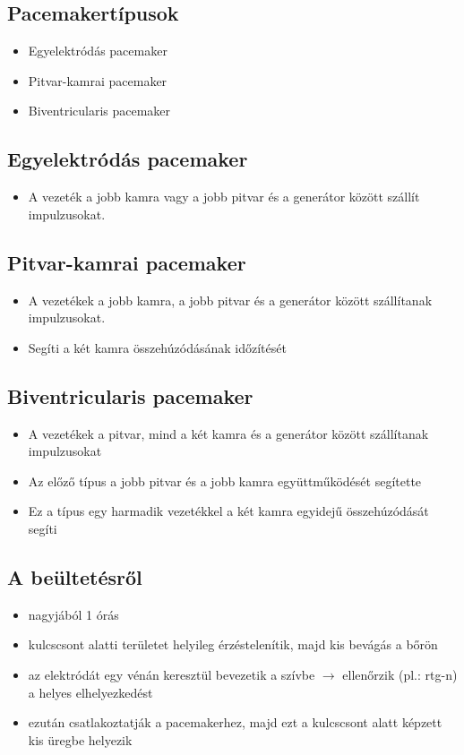 \subsection{Pacemakertípusok}
\begin{itemize}
    \item Egyelektródás pacemaker
    \item Pitvar-kamrai pacemaker
    \item Biventricularis pacemaker
\end{itemize}

\subsection{Egyelektródás pacemaker}
\begin{itemize}
    \item A vezeték a jobb
    kamra vagy a jobb
    pitvar és a generátor
    között szállít
    impulzusokat.
\end{itemize}

\subsection{Pitvar-kamrai pacemaker}
\begin{itemize}
    \item A vezetékek a jobb kamra, a jobb pitvar és a
    generátor között szállítanak impulzusokat.
    \item Segíti a két kamra
    összehúzódásának
    időzítését
\end{itemize}

\subsection{Biventricularis pacemaker}
\begin{itemize}
    \item A vezetékek a pitvar, mind a két
    kamra és a generátor között
    szállítanak impulzusokat
    \item Az előző típus a jobb pitvar és a
    jobb kamra együttműködését
    segítette
    \item Ez a típus egy harmadik
    vezetékkel a két kamra egyidejű összehúzódását
    segíti
\end{itemize}

\subsection{A beültetésről}
\begin{itemize}
    \item nagyjából 1 órás
    \item kulcscsont alatti területet helyileg
    érzéstelenítik, majd kis bevágás a bőrön
    \item az elektródát egy vénán keresztül bevezetik a
    szívbe $\rightarrow$ ellenőrzik (pl.: rtg-n) a helyes
    elhelyezkedést
    \item ezután csatlakoztatják a pacemakerhez, majd
    ezt a kulcscsont alatt képzett kis üregbe
    helyezik
\end{itemize}

